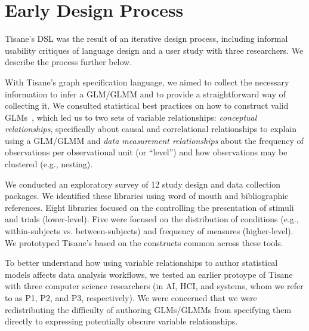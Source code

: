 \section{Early Design Process}
Tisane's DSL was the result of an iterative design process,
including informal usability critiques of language design and a user study
with three researchers. We describe the process further below. 


With Tisane's graph specification language, we aimed to collect the necessary
information to infer a GLM/GLMM and to provide a straightforward way of collecting
it. We consulted statistical best practices on how to construct valid
GLMs~\cite{kreft1998introducing,barr2013randomUpdated,barr2013random,mcelreath2020statistical},
which led us to two sets of variable relationships: \textit{conceptual
relationships}, specifically about causal and correlational relationships to
explain using a GLM/GLMM and \textit{data measurement relationships} about the
frequency of observations per observational unit (or ``level'') and how
observations may be clustered (e.g., nesting).

We conducted an exploratory survey of 12 study design and data collection
packages. We identified these libraries using word of mouth and bibliographic
references. Eight libraries %
focused on the controlling the presentation of stimuli and trials (lower-level).
Five were focused on the distribution of conditions (e.g., within-subjects vs.
between-subjects) and frequency of measures (higher-level). We prototyped
Tisane's \SDSL based on the constructs common across these tools. 

To better understand how using variable relationships to author statistical
models affects data analysis workflows, we tested an earlier protoype of Tisane
with three computer science researchers (in AI, HCI, and systems, whom we refer
to as P1, P2, and P3, respectively). We were concerned that we were
redistributing the difficulty of authoring GLMs/GLMMs from specifying them directly
to expressing potentially obscure variable relationships.

